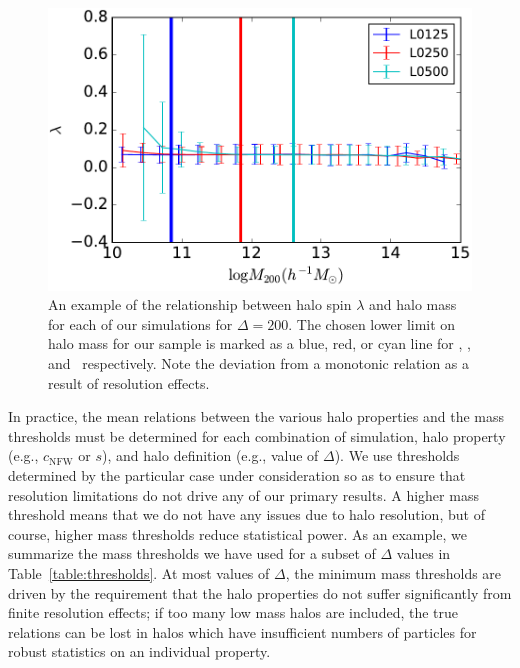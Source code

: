 \documentclass[usenatbib,usegraphicx,letterpaper]{mn2e}
\begin{document}
\begin{figure}
\centering
\includegraphics[width=.5\textwidth]{masscut_spin_d200.pdf}
\caption{
An example of the relationship between halo spin $\lambda$ 
and halo mass for each of our simulations for $\Delta =200$. 
The chosen lower limit on halo mass for our sample is marked 
as a blue, red, or cyan line for \simA, \simB, and \simC \ respectively. 
Note the deviation from a monotonic relation as a result of resolution effects.
}
\label{fig:spinrelation}
\end{figure}

In practice, the mean relations between the various halo properties and the mass thresholds must be determined 
for each combination of simulation, halo property (e.g., $c_{\mathrm{NFW}}$ or $s$), and halo definition (e.g.,
value of $\Delta$). We use thresholds determined by the particular case under consideration so as to ensure that
resolution limitations do not drive any of our primary results. A higher mass threshold means that we do not have
any issues due to halo resolution, but of course, higher mass thresholds reduce statistical power. As an example,
we summarize the mass thresholds we have used for a subset of $\Delta$ values in Table~\ref{table:thresholds}. 
At most values of $\Delta$, the minimum mass thresholds are driven by the requirement that the halo properties do 
not suffer significantly from finite resolution effects; if too many low mass halos are included, the true
relations can be lost in halos which have insufficient numbers of particles for robust statistics on an
individual property.

\end{document}
